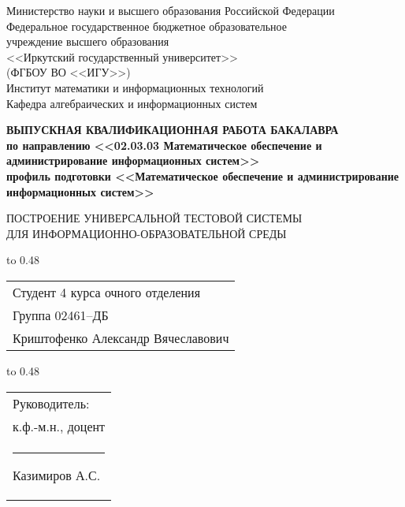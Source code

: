 \thispagestyle{empty}
\begin{center}
	Министерство науки и высшего образования Российской Федерации\\
	Федеральное государственное бюджетное образовательное\\
	учреждение высшего образования\\
	<<Иркутский государственный университет>>\\
	(ФГБОУ ВО <<ИГУ>>)\\
	Институт математики и информационных технологий\\
	Кафедра алгебраических и информационных систем\\
\end{center}

\vspace{2.7cm}

\begin{center}
	{\bf 
		ВЫПУСКНАЯ КВАЛИФИКАЦИОННАЯ РАБОТА
		БАКАЛАВРА\\[1mm]
		по направлению <<02.03.03 Математическое обеспечение и  \\[1mm] 
		администрирование информационных систем>>\\[1mm]
		профиль подготовки <<Математическое обеспечение и администрирование информационных систем>>
	}  
	
	\vspace{0.9cm}
	
	{
		ПОСТРОЕНИЕ УНИВЕРСАЛЬНОЙ 
		ТЕСТОВОЙ СИСТЕМЫ\\[1mm]
		ДЛЯ ИНФОРМАЦИОННО-ОБРАЗОВАТЕЛЬНОЙ СРЕДЫ 
	} %
\end{center}

\vspace{1.1cm}

{
	\noindent\hbox to 0.48\textwidth {%
		\mbox{ } \hfil} %
	\begin{tabular}[t]{l}
		Студент 4 курса очного отделения\\
		Группа 02461--ДБ\\
		Криштофенко Александр
		Вячеславович		
	\end{tabular}		
}

\vspace{0.8cm}

{
	\noindent\hbox to 0.48\textwidth {%
		\mbox{ } \hfil} %
	\begin{tabular}[t]{l}
		Руководитель:\\ к.ф.-м.н., доцент\\
		\rule{2.7cm}{0.5pt} Казимиров А.С.		
	\end{tabular}		
}

